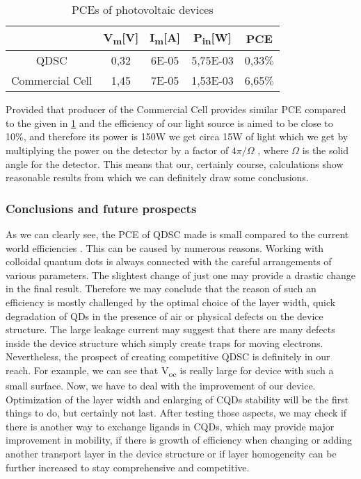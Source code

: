 \begin{table}[h]
\centering
\begin{tabular}{|c |c |c | c | c|}
\hline
& V\textsubscript{m}{[}V{]} & I\textsubscript{m}{[}A{]} &P\textsubscript{in}{[}W{]} & PCE\\
\hline
QDSC & 0,32 & 6E-05 & 5,75E-03 & 0,33$\%$\\
\hline
Commercial Cell & 1,45 & 7E-05 & 1,53E-03 & 6,65$\%$\\
\hline
\end{tabular}
\caption{PCEs of photovoltaic devices}
\label{tab:1stPCE}
\end{table}
\noindent Provided that producer of the Commercial Cell provides similar PCE
compared to the given in \ref{tab:1stPCE} and the efficiency of our light
source is aimed to be close to 10\%, and therefore its power is 150W we
get circa 15W of light which we get by multiplying the power on the
detector by a factor of $4\pi /\Omega $ , where $\Omega$ is the solid angle for the
detector. This means that our, certainly course, calculations show
reasonable results from which we can definitely draw some conclusions.

\subsubsection{Conclusions and future prospects}

As we can clearly see, the PCE of QDSC made is small compared to the
current world efficiencies \cite{Kamat2018}. This can be caused by numerous reasons.
Working with colloidal quantum dots is always connected with the careful
arrangements of various parameters. The slightest change of just one may
provide a drastic change in the final result. Therefore we may conclude
that the reason of such an efficiency is mostly challenged by the
optimal choice of the layer width, quick degradation of QDs in the
presence of air or physical defects on the device structure. The large
leakage current may suggest that there are many defects inside the
device structure which simply create traps for moving electrons.
Nevertheless, the prospect of creating competitive QDSC is definitely in
our reach. For example, we can see that V\textsubscript{oc} is really
large for device with such a small surface. Now, we have to deal with
the improvement of our device. Optimization of the layer width and
enlarging of CQDs stability will be the first things to do, but
certainly not last. After testing those aspects, we may check if there
is another way to exchange ligands in CQDs, which may provide major
improvement in mobility, if there is growth of efficiency when changing
or adding another transport layer in the device structure or if layer
homogeneity can be further increased to stay comprehensive and
competitive.

